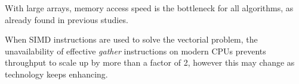 \documentclass[preprint,1p,times]{elsarticle}
\begin{document}
With large arrays, memory access speed is the bottleneck for all algorithms, as already found in previous studies.

When SIMD instructions are used to solve the vectorial problem, the unavailability of effective \textit{gather} instructions on modern CPUs prevents throughput to scale up by more than a factor of 2, however this may change as technology keeps enhancing. 


\end{document}
